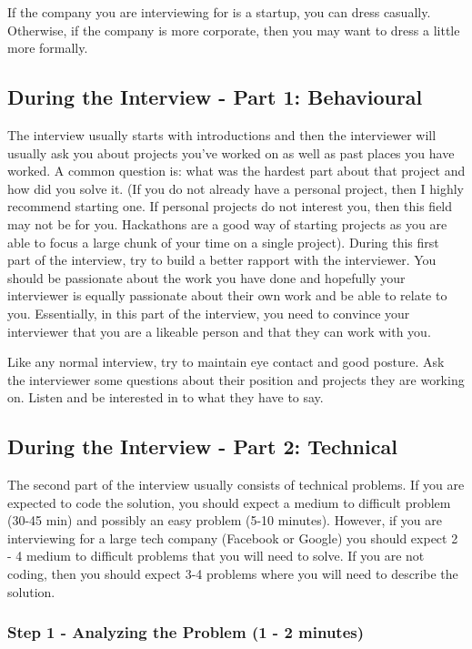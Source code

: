 \documentclass[11pt,oneside]{book}
\begin{document}
If the company you are interviewing for is a startup, you can dress casually. Otherwise, if the
    company is more corporate, then you may want to dress a little more formally.

\subsection{During the Interview - Part 1: Behavioural}

The interview usually starts with introductions and then the interviewer will usually ask you
    about projects you've worked on as well as past places you have worked. A common question is:
    what was the hardest part about that project and how did you solve it. (If you do not already
    have a personal project, then I highly recommend starting one. If personal projects do not
    interest you, then this field may not be for you. Hackathons are a good way of starting projects
    as you are able to focus a large chunk of your time on a single project). During this first part of the interview,
    try to build a better rapport with the interviewer. You should be passionate about the work you have done
    and hopefully your interviewer is equally passionate about their own work and be able to relate to you. 
    Essentially, in this part of the interview, you need to convince your interviewer that you are a likeable person and 
that they can work with you.

Like any normal interview, try to maintain eye contact and good posture. Ask the interviewer some questions about their position and projects they are working on. Listen and be interested in to what they have to say.

\subsection{During the Interview - Part 2: Technical}

The second part of the interview usually consists of technical problems. If you are expected to code the solution, you should expect a medium to difficult problem (30-45 min) and possibly an easy problem (5-10 minutes). However, if you are interviewing for a large tech company (Facebook or Google) you should expect 2 - 4 medium to difficult problems that you will need to solve. If you are not coding, then you should expect 3-4 problems where you will need to describe the solution.

\subsubsection{Step 1 - Analyzing the Problem (1 - 2 minutes)}
\end{document}
